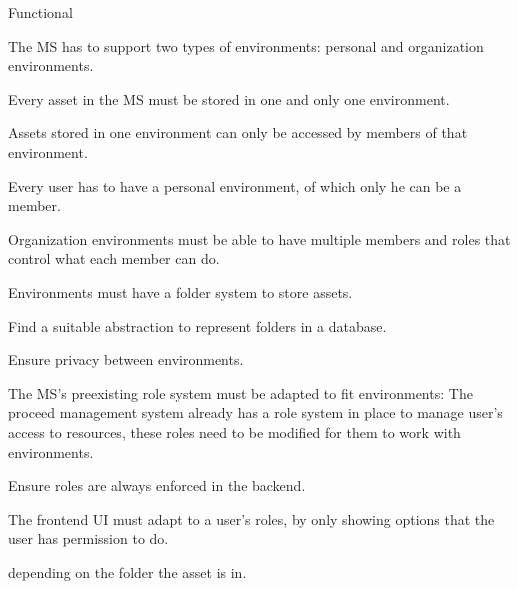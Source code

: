 \begin{myEnumerate}
  \item Functional
    \begin{myEnumerate}


      \item The MS has to support two types of environments: personal and organization environments.
        \begin{myEnumerate}
          \item Every asset in the MS must be stored in one and only one environment.

          \item Assets stored in one environment can only be accessed by members of that
            environment.

          \item Every user has to have a personal environment, of which only he can be a member.

          \item Organization environments must be able to have multiple members and roles that control what each member can do.

          \item Environments must have a folder system to store assets.
            \begin{myEnumerate}
              \item Find a suitable abstraction to represent folders in a database.

              \item Ensure privacy between environments.


              \item The MS's preexisting role system must be adapted to fit environments:
                The proceed management system already has a role system in place to manage user's access to resources, these roles need to be modified for them to work with environments.
                \begin{myEnumerate}
                  \item Ensure roles are always enforced in the backend.
                  \item The frontend UI must adapt to a user's roles, by only showing options that the user has permission to do.
                \end{myEnumerate}
                depending on the folder the asset is in.
            \end{myEnumerate}


\end{myEnumerate}
\end{myEnumerate}
\end{myEnumerate}
